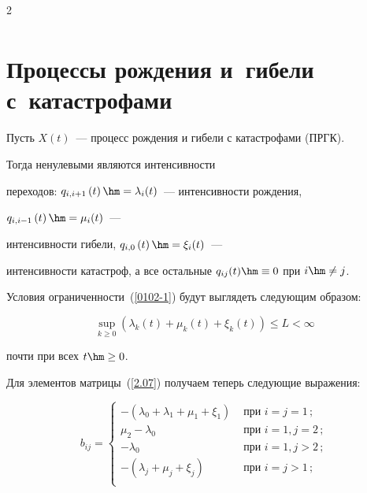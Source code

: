 \begin{multicols}{2}
\begin{multline*}
\end{multline*}



\section{Процессы рождения и~гибели с~катастрофами}



Пусть $X(t)$~--- процесс рождения и гибели с катастрофами (ПРГК).

Тогда ненулевыми являются интенсивности

переходов: $q_{i,i+1}\left( t\right)\hm=\lambda_i(t)$~--- интенсивности рождения,

$q_{i,i-1}\left(t\right) \hm= \mu_i(t)$~---

интенсивности гибели,  $q_{i,0}\left( t\right) \hm=\xi_i(t)$~---

интенсивности катастроф,  а все остальные $q_{ij}(t)\hm \equiv 0$ при $i\hm \neq j$.



Условия ограниченности~(\ref{0102-1}) будут выглядеть следующим образом:

\begin{equation*}

\sup\limits_{k \ge 0} \left(\lambda _k(t) +\mu_{k}(t) +\xi_{k}(t)\right) \le L < \infty


\end{equation*}

\noindent почти при всех $t \hm\ge 0$.



Для элементов матрицы~(\ref{2.07}) получаем теперь следующие выражения:


\begin{equation*}

b_{ij} = \begin{cases}

 -(\lambda_0+\lambda_1+\mu_1+\xi_1)  & \mbox { при }  i=j=1\,; \\

\mu_2-\lambda_0  & \mbox { при }  i=1,j=2\,; \\

-\lambda_0  & \mbox { при }  i=1,j>2\,; \\

-(\lambda_j+\mu_j+ \xi_j)  & \mbox { при } i=j >1\,; \\


\end{cases}
\end{equation*}
\end{multicols}
